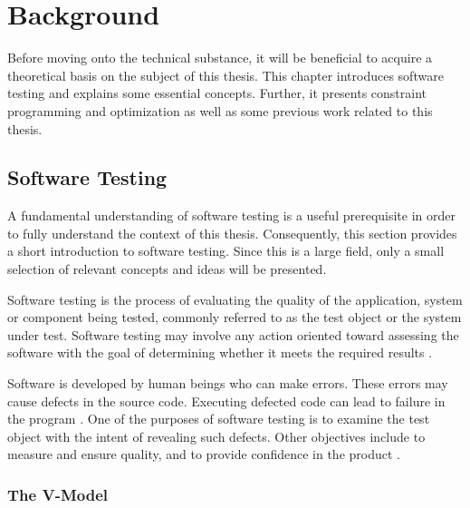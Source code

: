 \section{Background}\label{chapter.background}
\thispagestyle{plain}
Before moving onto the technical substance, it will be beneficial to acquire a theoretical basis on the subject of this thesis. This chapter introduces software testing and explains some essential concepts. Further, it presents constraint programming and optimization as well as some previous work related to this thesis.

\subsection{Software Testing}

A fundamental understanding of software testing is a useful prerequisite in order to fully understand the context of this thesis. Consequently, this section provides a short introduction to software testing. Since this is a large field, only a small selection of relevant concepts and ideas will be presented.  %

Software testing is the process of evaluating the quality of the application, system or component being tested, commonly referred to as the test object or the system under test. Software testing may involve any action oriented toward assessing the software with the goal of determining whether it meets the required results  \cite{[http://istqbexamcertification.com/what-is-a-software-testing/]}.

Software is developed by human beings who can make errors. These errors may cause defects in the source code. Executing defected code can lead to failure in the program  \cite{http://www.istqb.org/downloads/send/2-foundation-level-documents/3-foundation-level-syllabus-2011.html}. One of the purposes of software testing is to examine the test object with the intent of revealing such defects. Other objectives include to measure and ensure quality, and to provide confidence in the product \cite{SoftwareTestingFoundations}.

\subsubsection{The V-Model}

